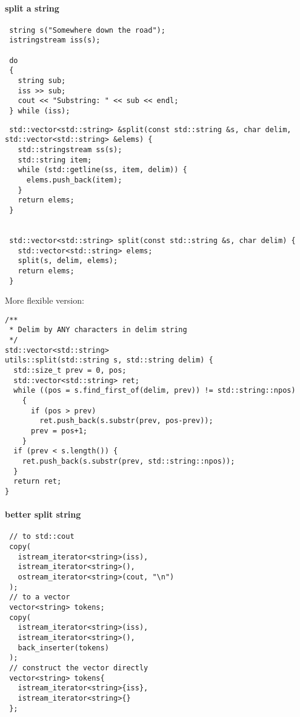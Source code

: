 \paragraph{split a string}

\begin{lstlisting}
 string s("Somewhere down the road");
 istringstream iss(s);

 do
 {
   string sub;
   iss >> sub;
   cout << "Substring: " << sub << endl;
 } while (iss);
\end{lstlisting}

\begin{lstlisting}
 std::vector<std::string> &split(const std::string &s, char delim, std::vector<std::string> &elems) {
   std::stringstream ss(s);
   std::string item;
   while (std::getline(ss, item, delim)) {
     elems.push_back(item);
   }
   return elems;
 }


 std::vector<std::string> split(const std::string &s, char delim) {
   std::vector<std::string> elems;
   split(s, delim, elems);
   return elems;
 }
\end{lstlisting}

More flexible version:
\begin{lstlisting}
/**
 * Delim by ANY characters in delim string
 */
std::vector<std::string>
utils::split(std::string s, std::string delim) {
  std::size_t prev = 0, pos;
  std::vector<std::string> ret;
  while ((pos = s.find_first_of(delim, prev)) != std::string::npos)
    {
      if (pos > prev)
        ret.push_back(s.substr(prev, pos-prev));
      prev = pos+1;
    }
  if (prev < s.length()) {
    ret.push_back(s.substr(prev, std::string::npos));
  }
  return ret;
}
\end{lstlisting}

\paragraph{better split string}
\begin{lstlisting}
 // to std::cout
 copy(
   istream_iterator<string>(iss),
   istream_iterator<string>(),
   ostream_iterator<string>(cout, "\n")
 );
 // to a vector
 vector<string> tokens;
 copy(
   istream_iterator<string>(iss),
   istream_iterator<string>(),
   back_inserter(tokens)
 );
 // construct the vector directly
 vector<string> tokens{
   istream_iterator<string>{iss},
   istream_iterator<string>{}
 };
\end{lstlisting}

